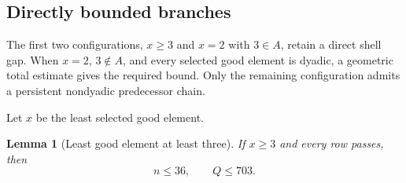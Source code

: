 \documentclass[11pt]{article}
\newtheorem{lemma}[theorem]{Lemma}
\theoremstyle{definition}
\theoremstyle{remark}
\begin{document}
\subsection{Directly bounded branches}

The first two configurations, \(x\ge3\) and \(x=2\) with \(3\in A\), retain
a direct shell gap.  When \(x=2\), \(3\notin A\), and every selected good
element is dyadic, a geometric total estimate gives the required bound.  Only
the remaining configuration admits a persistent nondyadic predecessor chain.

Let \(x\) be the least selected good element.

\begin{lemma}[Least good element at least three]\label{lem:s1-x-ge-three}
If \(x\ge3\) and every row passes, then
\[
 n\le36,\qquad Q\le703.
\]
\end{lemma}
\end{document}

